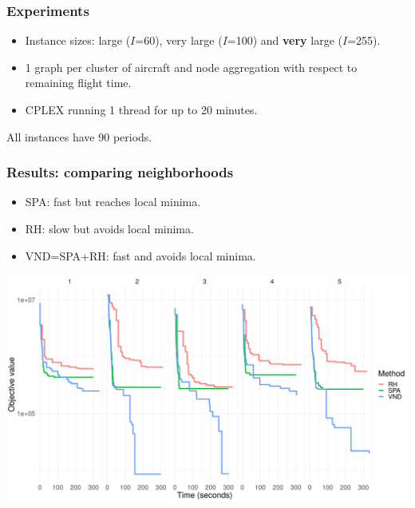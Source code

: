 \begin{frame}
\frametitle{\textbf{Experiments}}
  
  \begin{itemize}
    \item Instance sizes: large ($I$=60), very large ($I$=100) and \textbf{very} large ($I$=255).
    \item 1 graph per cluster of aircraft and node aggregation with respect to remaining flight time.
    \item CPLEX running 1 thread for up to 20 minutes.
  \end{itemize}
  All instances have 90 periods.
\end{frame}

\begin{frame}
\frametitle{\textbf{Results: comparing neighborhoods}}
  \begin{itemize}
    \item SPA: fast but reaches local minima.
    \item RH: slow but avoids local minima.
    \item VND=SPA+RH: fast and avoids local minima.
  \end{itemize}

  \includegraphics[width=0.8\linewidth]{images/compare_neighbors.png}
\end{frame}

